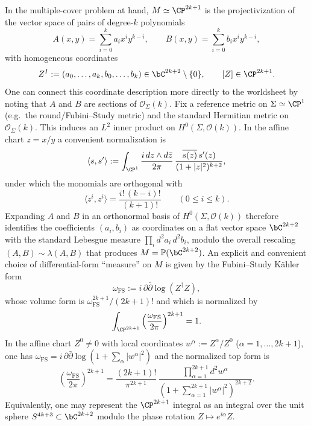 \documentclass[12pt]{article}
\begin{document}
In the multiple-cover problem at hand, $M\simeq\CP^{2k+1}$ is the
projectivization of the vector space of pairs of degree-$k$ polynomials
\begin{equation*}
  A(x,y)=\sum_{i=0}^k a_i x^i y^{k-i},\qquad
  B(x,y)=\sum_{i=0}^k b_i x^i y^{k-i},
\end{equation*}
with homogeneous coordinates
\begin{equation*}
  Z^I := (a_0,\dots,a_k,b_0,\dots,b_k)\in \bC^{2k+2}\setminus\{0\},
  \qquad
  [Z]\in \CP^{2k+1}.
\end{equation*}
One can connect this coordinate description more directly to the worldsheet by
noting that $A$ and $B$ are sections of $\mathcal{O}_\Sigma(k)$. Fix a reference
metric on $\Sigma\simeq\CP^1$ (e.g.\ the round/Fubini--Study metric) and the
standard Hermitian metric on $\mathcal{O}_\Sigma(k)$. This induces an $L^2$
inner product on $H^0(\Sigma,\mathcal{O}(k))$. In the affine chart $z=x/y$ a
convenient normalization is
\begin{equation*}
  \langle s,s'\rangle
  := \int_{\CP^1}\frac{i\,dz\wedge d\bar z}{2\pi}\,
  \frac{\overline{s(z)}\,s'(z)}{(1+|z|^2)^{k+2}},
\end{equation*}
under which the monomials are orthogonal with
\begin{equation*}
  \langle z^i,z^i\rangle=\frac{i!\,(k-i)!}{(k+1)!}\qquad (0\le i\le k).
\end{equation*}
Expanding $A$ and $B$ in an orthonormal basis of $H^0(\Sigma,\mathcal{O}(k))$
therefore identifies the coefficients $(a_i,b_i)$ as coordinates on a flat
vector space $\bC^{2k+2}$ with the standard Lebesgue measure
$\prod_i d^2a_i\,d^2b_i$, modulo the overall rescaling
$(A,B)\sim\lambda(A,B)$ that produces $M=\mathbb{P}(\bC^{2k+2})$.
An explicit and convenient choice of differential-form ``measure'' on $M$ is
given by the Fubini--Study K\"ahler form
\begin{equation*}
  \omega_{\mathrm{FS}}:= i\,\partial\bar\partial \log(Z^\dagger Z),
\end{equation*}
whose volume form is $\omega_{\mathrm{FS}}^{2k+1}/(2k+1)!$ and which is
normalized by
\begin{equation*}
  \int_{\CP^{2k+1}} \left(\frac{\omega_{\mathrm{FS}}}{2\pi}\right)^{2k+1}=1.
\end{equation*}
In the affine chart $Z^0\neq 0$ with local coordinates $w^\alpha:=Z^\alpha/Z^0$
($\alpha=1,\dots,2k+1$), one has $\omega_{\mathrm{FS}}= i\,\partial\bar\partial
\log(1+\sum_\alpha |w^\alpha|^2)$ and the normalized top form is
\begin{equation*}
  \left(\frac{\omega_{\mathrm{FS}}}{2\pi}\right)^{2k+1}
  =
  \frac{(2k+1)!}{\pi^{2k+1}}\,
  \frac{\prod_{\alpha=1}^{2k+1} d^2 w^\alpha}{\left(1+\sum_{\alpha=1}^{2k+1}|w^\alpha|^2\right)^{2k+2}}.
\end{equation*}
Equivalently, one may represent the $\CP^{2k+1}$ integral as an integral over
the unit sphere $S^{4k+3}\subset\bC^{2k+2}$ modulo the phase rotation
$Z\mapsto e^{i\alpha}Z$.
\end{document}
